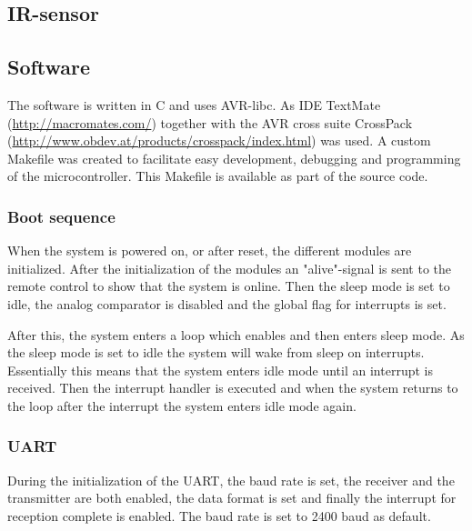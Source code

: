 \documentclass[a4paper,twoside,titlepage]{article}
\begin{document}

\subsection{IR-sensor} %
\label{sub:ir_sensor}

\subsection{Software} %
\label{sub:software}

The software is written in C and uses AVR-libc. As IDE TextMate (\url{http://macromates.com/}) together with the AVR cross suite CrossPack (\url{http://www.obdev.at/products/crosspack/index.html}) was used. A custom Makefile was created to facilitate easy development, debugging and programming of the microcontroller. This Makefile is available as part of the source code.

\subsubsection{Boot sequence} %
\label{ssub:boot_sequence}

When the system is powered on, or after reset, the different modules are initialized. After the initialization of the modules an "alive"-signal is sent to the remote control to show that the system is online. Then the sleep mode is set to idle, the analog comparator is disabled and the global flag for interrupts is set.

After this, the system enters a loop which enables and then enters sleep mode. As the sleep mode is set to idle the system will wake from sleep on interrupts. Essentially this means that the system enters idle mode until an interrupt is received. Then the interrupt handler is executed and when the system returns to the loop after the interrupt the system enters idle mode again.

\subsubsection{UART} %
\label{ssub:uart}

During the initialization of the UART, the baud rate is set, the receiver and the transmitter are both enabled, the data format is set and finally the interrupt for reception complete is enabled. The baud rate is set to 2400 baud as default.
\end{document}
